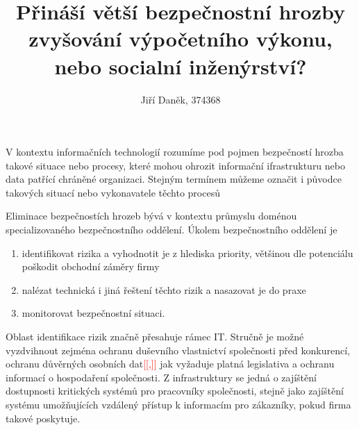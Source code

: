 \documentclass[12pt]{article}
\title{Přináší větší bezpečnostní hrozby zvyšování výpočetního výkonu, nebo socialní inženýrství?}
\author{Jiří Daněk, 374368}
\newcommand\todo[1]{\textcolor{red}{[[#1]]}}
\begin{document}
\maketitle



V kontextu informačních technologií rozumíme pod pojmen bezpečností hrozba takové situace nebo procesy, které mohou ohrozit informační ifrastrukturu nebo data patřící chráněné organizaci. Stejným termínem můžeme označit i původce takových situací nebo vykonavatele těchto procesů

Eliminace bezpečnostích hrozeb bývá v kontextu průmyslu doménou specializovaného bezpečnostního oddělení. Úkolem bezpečnostního oddělení je

\begin{enumerate}
\item identifikovat rizika a vyhodnotit je z hlediska priority, většinou dle potenciálu poškodit obchodní záměry firmy
\item nalézat technická i jiná řeštení těchto rizik a nasazovat je do praxe
\item monitorovat bezpečnostní situaci.
\end{enumerate}

Oblast identifikace rizik značně přesahuje rámec IT. Stručně je možné vyzdvihnout zejména ochranu duševního vlastnictví společnosti před konkurencí, ochranu důvěrných osobních dat\todo{,} jak vyžaduje platná legislativa a ochranu informací o hospodaření společnosti. Z infrastruktury se jedná o zajíštění dostupnosti kritických systémů pro pracovníky společnosti, stejně jako zajíštění systému umožňujících vzdálený přístup k informacím pro zákazníky, pokud firma takové poskytuje.

\end{document}
